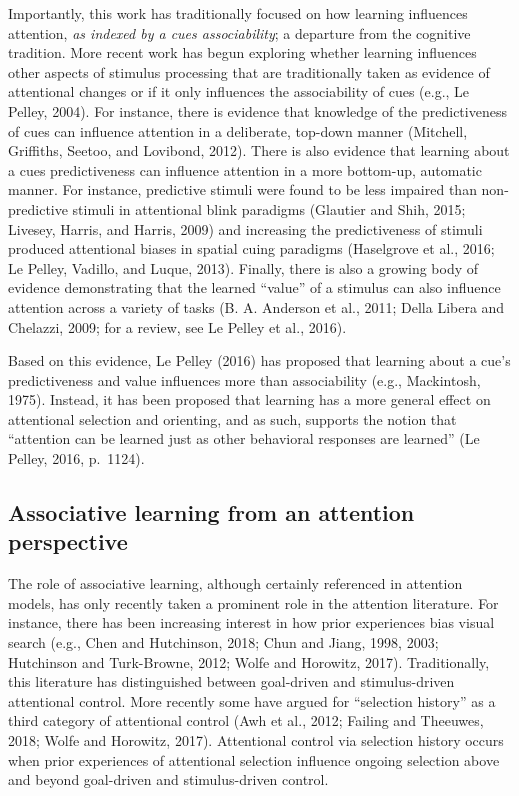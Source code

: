 \documentclass[]{DissertateCUNY}
\begin{document}
Importantly, this work has traditionally focused on how learning
influences attention, \textit{as indexed by a cues associability}; a
departure from the cognitive tradition. More recent work has begun
exploring whether learning influences other aspects of stimulus
processing that are traditionally taken as evidence of attentional
changes or if it only influences the associability of cues (e.g., Le
Pelley, 2004). For instance, there is evidence that knowledge of the
predictiveness of cues can influence attention in a deliberate, top-down
manner (Mitchell, Griffiths, Seetoo, and Lovibond, 2012). There is also
evidence that learning about a cues predictiveness can influence
attention in a more bottom-up, automatic manner. For instance,
predictive stimuli were found to be less impaired than non-predictive
stimuli in attentional blink paradigms (Glautier and Shih, 2015;
Livesey, Harris, and Harris, 2009) and increasing the predictiveness of
stimuli produced attentional biases in spatial cuing paradigms
(Haselgrove et al., 2016; Le Pelley, Vadillo, and Luque, 2013). Finally,
there is also a growing body of evidence demonstrating that the learned
``value'' of a stimulus can also influence attention across a variety of
tasks (B. A. Anderson et al., 2011; Della Libera and Chelazzi, 2009; for
a review, see Le Pelley et al., 2016).

Based on this evidence, Le Pelley (2016) has proposed that learning
about a cue's predictiveness and value influences more than
associability (e.g., Mackintosh, 1975). Instead, it has been proposed
that learning has a more general effect on attentional selection and
orienting, and as such, supports the notion that ``attention can be
learned just as other behavioral responses are learned'' (Le Pelley,
2016, p.~1124).

\hypertarget{associative-learning-from-an-attention-perspective}{%
\subsection{Associative learning from an attention
perspective}\label{associative-learning-from-an-attention-perspective}}

The role of associative learning, although certainly referenced in
attention models, has only recently taken a prominent role in the
attention literature. For instance, there has been increasing interest
in how prior experiences bias visual search (e.g., Chen and Hutchinson,
2018; Chun and Jiang, 1998, 2003; Hutchinson and Turk-Browne, 2012;
Wolfe and Horowitz, 2017). Traditionally, this literature has
distinguished between goal-driven and stimulus-driven attentional
control. More recently some have argued for ``selection history'' as a
third category of attentional control (Awh et al., 2012; Failing and
Theeuwes, 2018; Wolfe and Horowitz, 2017). Attentional control via
selection history occurs when prior experiences of attentional selection
influence ongoing selection above and beyond goal-driven and
stimulus-driven control.
\end{document}
